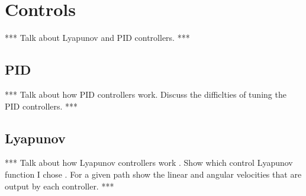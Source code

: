 \chapter{Controls}
\label{sec:controls}
*** Talk about Lyapunov and PID controllers. ***

\section{PID}
*** Talk about how PID controllers work. Discuss the difficlties of tuning the PID controllers. ***

\section{Lyapunov}
*** Talk about how Lyapunov controllers work \cite{Khalil02}. Show which control Lyapunov function I chose \cite{Rusu05RobotuxLyapunov}. For a given path show the linear and angular velocities that are output by each controller. ***